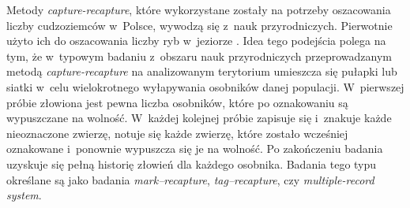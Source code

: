 \documentclass[12pt,a4paper]{article}
\providecommand{\DIFadd}[1]{{\protect\color{blue}\uwave{#1}}} %
\providecommand{\DIFaddbegin}{} %
\providecommand{\DIFaddend}{} %
\begin{document}
Metody \textit{capture-recapture}, które wykorzystane zostały na potrzeby oszacowania liczby cudzoziemców w~Polsce, wywodzą się z~nauk przyrodniczych. Pierwotnie użyto ich do oszacowania liczby ryb w~jeziorze \DIFaddbegin \DIFadd{\mbox{%
\citep{goudie2007captures}}\hspace{0pt}%
}\DIFaddend . Idea tego podejścia polega na tym, że w~typowym badaniu z~obszaru nauk przyrodniczych przeprowadzanym metodą \textit{capture-recapture} na analizowanym terytorium umieszcza się pułapki lub siatki w~celu wielokrotnego wyłapywania osobników danej populacji. W~pierwszej próbie złowiona jest pewna liczba osobników, które po oznakowaniu są wypuszczane na wolność. W~każdej kolejnej próbie zapisuje się i~znakuje każde nieoznaczone zwierzę, notuje się każde zwierzę, które zostało wcześniej oznakowane i~ponownie wypuszcza się je na wolność. Po zakończeniu badania uzyskuje się pełną historię złowień dla każdego osobnika. Badania tego typu określane są jako badania \textit{mark–recapture}, \textit{tag–recapture}, czy \textit{multiple-record system}.  
\end{document}
